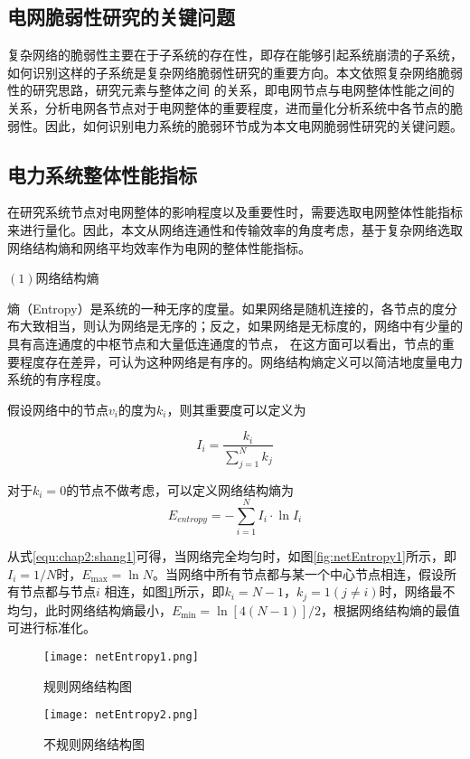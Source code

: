 \subsection{电网脆弱性研究的关键问题}

复杂网络的脆弱性主要在于子系统的存在性，即存在能够引起系统崩溃的子系统，如何识别这样的子系统是复杂网络脆弱性研究的重要方向。本文依照复杂网络脆弱性的研究思路，研究元素与整体之间
的关系，即电网节点与电网整体性能之间的关系，分析电网各节点对于电网整体的重要程度，进而量化分析系统中各节点的脆弱性。因此，如何识别电力系统的脆弱环节成为本文电网脆弱性研究的关键问题。



\subsection{电力系统整体性能指标}
\label{sec:loadModel}
在研究系统节点对电网整体的影响程度以及重要性时，需要选取电网整体性能指标来进行量化。因此，本文从网络连通性和传输效率的角度考虑，基于复杂网络选取网络结构熵和网络平均效率作为电网的整体性能指标。

$(1)$网络结构熵

熵（Entropy）是系统的一种无序的度量。如果网络是随机连接的，各节点的度分布大致相当，则认为网络是无序的；反之，如果网络是无标度的，网络中有少量的具有高连通度的中枢节点和大量低连通度的节点，
在这方面可以看出，节点的重要程度存在差异，可认为这种网络是有序的。网络结构熵定义可以简洁地度量电力系统的有序程度。

\begin{definition}
  假设网络中的节点$v_i$的度为$k_i$，则其重要度可以定义为\cite{refsNetShang}
\end{definition}
\begin{equation}
  I_{i}=\frac{k_{i}}{\sum_{j=1}^{N} k_{j}}
\end{equation}

对于$k_i = 0$的节点不做考虑，可以定义网络结构熵为
\begin{equation}
\label{equ:chap2:shang1}
  E_{entropy}=-\sum_{i=1}^{N} I_{i} \cdot \ln I_{i}
\end{equation}

从式\ref{equ:chap2:shang1}可得，当网络完全均匀时，如图\ref{fig:netEntropy1}所示，即$I_{i}=1 / N$时，$E_{\max }=\ln N$。当网络中所有节点都与某一个中心节点相连，假设所有节点都与节点$i$
相连，如图\ref{fig:netEntropy2}所示，即$k_i = N-1$，$k_j = 1(j \neq i)$时，网络最不均匀，此时网络结构熵最小，$E_{\min }=\ln [4(N-1)] / 2$，根据网络结构熵的最值可进行标准化。
\begin{figure}[H] %
  \begin{minipage}[t]{0.5\linewidth}
  \centering
  \texttt{[image: netEntropy1.png]}
  \caption{规则网络结构图}
  \label{fig:netEntropy1}
  \end{minipage}
  \begin{minipage}[t]{0.5\linewidth}
  \centering
  \texttt{[image: netEntropy2.png]}
  \caption{不规则网络结构图}
  \label{fig:netEntropy2}
  \end{minipage}
\end{figure}

